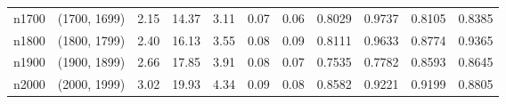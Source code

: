 \begin{tabular}{llrrrrrrrrr}
   n1700 & (1700, 1699) &  2.15 & 14.37 & 3.11 &  0.07 &   0.06 &   0.8029 &   0.9737 &     0.8105 &      0.8385 \\
   n1800 & (1800, 1799) &  2.40 & 16.13 & 3.55 &  0.08 &   0.09 &   0.8111 &   0.9633 &     0.8774 &      0.9365 \\
   n1900 & (1900, 1899) &  2.66 & 17.85 & 3.91 &  0.08 &   0.07 &   0.7535 &   0.7782 &     0.8593 &      0.8645 \\
   n2000 & (2000, 1999) &  3.02 & 19.93 & 4.34 &  0.09 &   0.08 &   0.8582 &   0.9221 &     0.9199 &      0.8805 \\
\bottomrule
\end{tabular}

